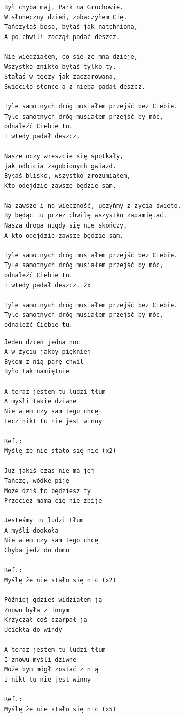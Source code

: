 \documentclass[12pt]{article}
\begin{document}
\begin{verbatim}
Był chyba maj, Park na Grochowie.
W słoneczny dzień, zobaczyłem Cię.
Tańczyłaś boso, byłaś jak natchniona,
A po chwili zaczął padać deszcz.

Nie wiedziałem, co się ze mną dzieje,
Wszystko znikło byłaś tylko ty.
Stałaś w tęczy jak zaczarowana,
Świeciło słonce a z nieba padał deszcz.

Tyle samotnych dróg musiałem przejść bez Ciebie.
Tyle samotnych dróg musiałem przejść by móc,
odnaleźć Ciebie tu.
I wtedy padał deszcz.

Nasze oczy wreszcie się spotkały,
jak odbicia zagubionych gwiazd.
Byłaś blisko, wszystko zrozumiałem,
Kto odejdzie zawsze będzie sam.

Na zawsze i na wieczność, uczyńmy z życia święto,
By będąc tu przez chwilę wszystko zapamiętać.
Nasza droga nigdy się nie skończy,
A kto odejdzie zawsze będzie sam.

Tyle samotnych dróg musiałem przejść bez Ciebie.
Tyle samotnych dróg musiałem przejść by móc,
odnaleźć Ciebie tu.
I wtedy padał deszcz. 2x

Tyle samotnych dróg musiałem przejść bez Ciebie.
Tyle samotnych dróg musiałem przejść by móc,
odnaleźć Ciebie tu.
\end{verbatim}
\clearpage

\begin{verbatim}
Jeden dzień jedna noc
A w życiu jakby piękniej
Byłem z nią parę chwil
Było tak namiętnie

A teraz jestem tu ludzi tłum
A myśli takie dziwne
Nie wiem czy sam tego chcę
Lecz nikt tu nie jest winny

Ref.:
Myślę że nie stało się nic (x2)

Już jakiś czas nie ma jej
Tańczę, wódkę piję
Może dziś to będziesz ty
Przecież mama cię nie zbije

Jesteśmy tu ludzi tłum
A myśli dookoła
Nie wiem czy sam tego chcę
Chyba jedź do domu

Ref.:
Myślę że nie stało się nic (x2)

Później gdzieś widziałem ją
Znowu była z innym
Krzyczał coś szarpał ją
Uciekła do windy

A teraz jestem tu ludzi tłum
I znowu myśli dziwne
Może bym mógł zostać z nią
I nikt tu nie jest winny

Ref.:
Myślę że nie stało się nic (x5)
\end{verbatim}
\clearpage
\end{document}
